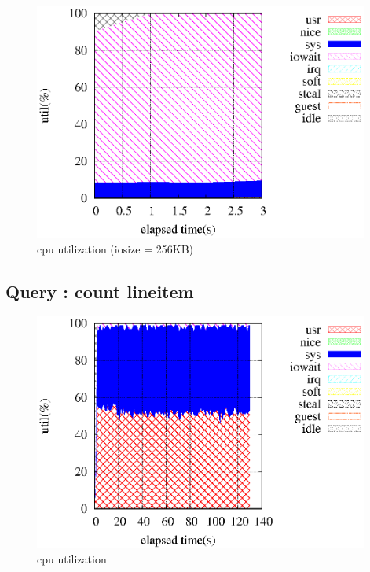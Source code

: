 \documentclass[11pt,a4paper]{jsarticle}
\begin{document}
\begin{figure}[thbp]
 \begin{center}
  \includegraphics[width=110mm]{md0_io262144_thr1core8.eps}
 \end{center}
 \caption{cpu utilization (iosize = 256KB)}
 \label{fig:cpuutil256}
\end{figure}

\clearpage
\subsection{Query : count lineitem}
\begin{figure}[thbp]
 \begin{center}
  \includegraphics[width=110mm]{countlineitemcore1.eps}
 \end{center}
 \caption{cpu utilization}
 \label{fig:clinecpusys}
\end{figure}
\end{document}
